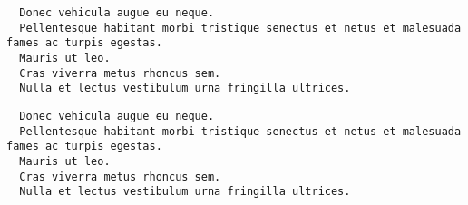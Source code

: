 \documentclass[10pt]{article}
\begin{document}
  \lipsum[1]

  \begin{verbatim}
  Donec vehicula augue eu neque.
  Pellentesque habitant morbi tristique senectus et netus et malesuada fames ac turpis egestas.
  Mauris ut leo.
  Cras viverra metus rhoncus sem.
  Nulla et lectus vestibulum urna fringilla ultrices.
  \end{verbatim}

  \begin{verbatim}
  Donec vehicula augue eu neque.
  Pellentesque habitant morbi tristique senectus et netus et malesuada fames ac turpis egestas.
  Mauris ut leo.
  Cras viverra metus rhoncus sem.
  Nulla et lectus vestibulum urna fringilla ultrices.
  \end{verbatim}

  \lipsum[2]
\end{document}
